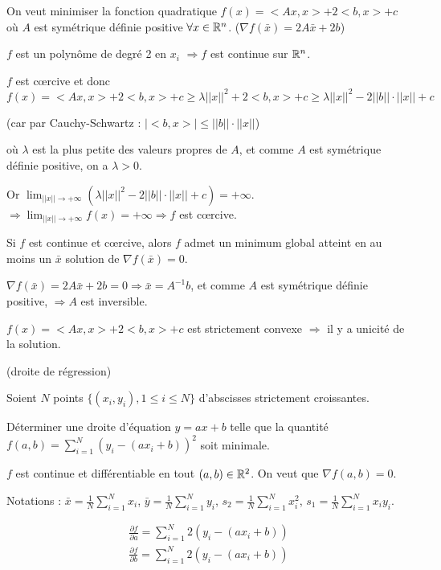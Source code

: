 		\begin{exemple}
		On veut minimiser la fonction quadratique $f(x) = <Ax, x> +2<b, x> +c$ où $A$ est symétrique définie positive $\forall x \in \mathbb{R}^n$.
		($\nabla f(\bar{x}) = 2A\bar{x} +2b$)
		
		$f$ est un polynôme de degré 2 en $x_i$ $\Rightarrow f$ est continue sur $\mathbb{R}^n$.
		
		$f$ est c\oe rcive et donc 
	 	$ f(x) = <Ax, x>  +2<b, x> +c \geq \lambda ||x||^2 + 2<b, x> +c \geq \lambda ||x||^2 - 2||b|| \cdot ||x|| +c $
		
		(car par Cauchy-Schwartz : $|<b, x>| \leq ||b|| \cdot ||x||$)
		
		où $\lambda$ est la plus petite des valeurs propres de $A$, et comme $A$ est symétrique définie positive, on a $\lambda >0$.
		
		Or $\displaystyle \lim_{||x|| \rightarrow +\infty}( \lambda ||x||^2 -2||b|| \cdot ||x|| +c) = +\infty$.
		$\displaystyle \Rightarrow \lim_{||x|| \rightarrow +\infty}f(x) = +\infty \Rightarrow f$ est c\oe rcive.
		
		Si $f$ est continue et c\oe rcive, alors $f$ admet un minimum global atteint en au moins un $\bar{x}$ solution de $\nabla f(\bar{x}) = 0$.
		
		$\nabla f(\bar{x}) = 2A\bar{x} +2b = 0 \Rightarrow \bar{x} = A^{-1} b$, et comme $A$ est symétrique définie positive, $\Rightarrow A$ est inversible.
		
		$f(x) = <Ax, x> +2<b, x> +c$ est strictement convexe $\Rightarrow$ il y a unicité de la solution.
		\end{exemple}
		
		\begin{exemple} (droite de régression)
		
		Soient $N$ points $\{(x_i, y_i), 1\leq i \leq N\}$ d'abscisses strictement croissantes.
		
		Déterminer une droite d'équation $y=ax+b$ telle que la quantité $\displaystyle f(a, b) = \sum_{i=1}^N (y_i-(ax_i+b))^2$ soit minimale.
		
		$f$ est continue et différentiable en tout $(a, b) \in \mathbb{R}^2$.
		On veut que $\nabla f(a, b) = 0$.
		
		Notations :
		$\displaystyle \bar{x} = \frac{1}{N} \sum_{i=1}^N x_i$, 
		$\displaystyle \bar{y} = \frac{1}{N} \sum_{i=1}^N y_i$, 
		$\displaystyle s_2 = \frac{1}{N} \sum_{i=1}^N x_i^2$, 
		$\displaystyle s_1 = \frac{1}{N} \sum_{i=1}^N x_i y_i$.
		
		\begin{eqnarray*}%
 \frac{\partial f}{\partial a} = \sum_{i=1}^N 2(y_i-(ax_i+b)) \\ \frac{\partial f}{\partial b} = \sum_{i=1}^N 2(y_i-(ax_i+b)) \end{eqnarray*}

		\end{exemple}
		
